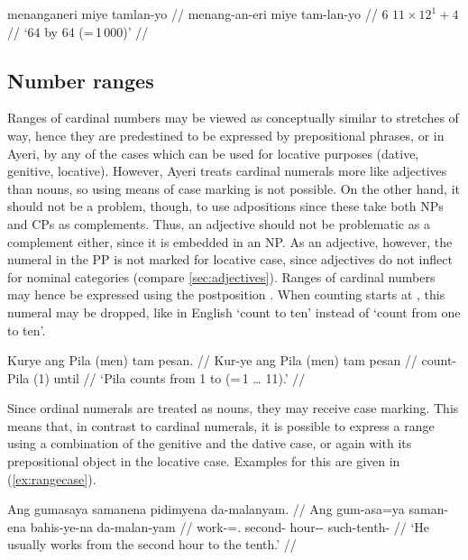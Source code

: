 \a\begingl
	\gla menanganeri miye tamlan-yo //
	\glb menang-an-eri miye tam-lan-yo //
	 {$6$} {$11 \times 12^1 + 4$} //
	\glft `6\elv{}4 by 6\elv{}4 (=\,1\,000)' //
\endgl

\xe


\subsection{Number ranges}

Ranges of cardinal numbers may be viewed as conceptually similar to stretches
of way, hence they are predestined to be expressed by prepositional phrases, or
in Ayeri, by any of the cases which can be used for locative purposes (dative,
genitive, locative). However, Ayeri treats cardinal numerals more like
adjectives than nouns, so using means of case marking is not possible. On the
other hand, it should not be a problem, though, to use adpositions since these
take both NPs and CPs as complements. Thus, an adjective should not be
problematic as a complement either, since it is embedded in an NP. As an
adjective, however, the numeral in the PP is not marked for locative case,
since adjectives do not inflect for nominal categories (compare
\autoref{sec:adjectives}). Ranges of cardinal numbers may hence be expressed
using the postposition . When counting starts at
, this numeral may be dropped, like in English `count to
ten' instead of `count from one to ten'.

\ex
\begingl
	\gla Kurye ang Pila {\normalfont (}men{\normalfont )} tam pesan. //
	\glb Kur-ye ang Pila (men) tam pesan //
	\glc count-\TsgF{} \Aarg{} Pila (1) \elv{} until //
	\glft `Pila counts from 1 to \elv{} (=\,1 … 11).' //
\endgl
\xe

Since ordinal numerals are treated as nouns, they may receive case marking. 
This means that, in contrast to cardinal numerals, it is possible to express a 
range using a combination of the genitive and the dative case, or again 
 with its prepositional object in the locative case. 
Examples for this are given in (\ref{ex:rangecase}).

\pex\label{ex:rangecase}
\a\label{ex:rangecase1}\begingl
	\gla Ang gumasaya samanena pidimyena da-malanyam. //
	\glb Ang gum-asa=ya saman-ena bahis-ye-na da-malan-yam //
	\glc \AgtT{} work-\Hab{}=\TsgM{}.\Top{} second-\Gen{} hour-\Pl{}-\Gen{} 
		such-tenth-\Dat{} //
	\glft `He usually works from the second hour to the tenth.' //
\endgl

